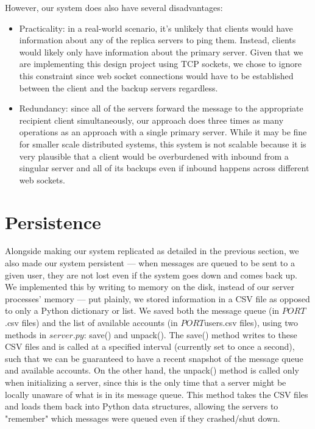 \documentclass[
	a4paper, %
	10pt, %
	unnumberedsections, %
	twoside, %
]{LTJournalArticle}
\begin{document}
However, our system does also have several disadvantages: 
\begin{itemize}
    \item Practicality: in a real-world scenario, it's unlikely that clients would have information about any of the replica servers to ping them. Instead, clients would likely only have information about the primary server. Given that we are implementing this design project using TCP sockets, we chose to ignore this constraint since web socket connections would have to be established between the client and the backup servers regardless. 
    \item Redundancy: since all of the servers forward the message to the appropriate recipient client simultaneously, our approach does three times as many operations as an approach with a single primary server. While it may be fine for smaller scale distributed systems, this system is not scalable because it is very plausible that a client would be overburdened with inbound from a singular server and all of its backups even if inbound happens across different web sockets. 
\end{itemize}


\section{Persistence}

Alongside making our system replicated as detailed in the previous section, we also made our system persistent --- when messages are queued to be sent to a given user, they are not lost even if the system goes down and comes back up. We implemented this by writing to memory on the disk, instead of our server processes' memory --- put plainly, we stored information in a CSV file as opposed to only a Python dictionary or list. We saved both the message queue (in $PORT$.csv files) and the list of available accounts (in $PORT$users.csv files), using two methods in $server.py$: save() and unpack(). The save() method writes to these CSV files and is called at a specified interval (currently set to once a second), such that we can be guaranteed to have a recent snapshot of the message queue and available accounts. On the other hand, the unpack() method is called only when initializing a server, since this is the only time that a server might be locally unaware of what is in its message queue. This method takes the CSV files and loads them back into Python data structures, allowing the servers to "remember" which messages were queued even if they crashed/shut down. 
\end{document}
